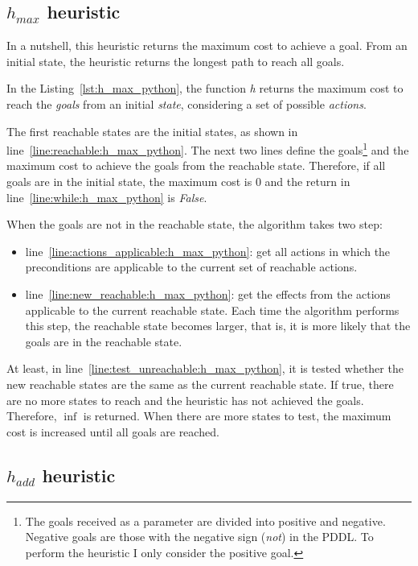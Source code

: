 \documentclass[letterpaper]{article}
\begin{document}
\subsection{$h_{max}$ heuristic}
In a nutshell, this heuristic returns the maximum cost to achieve a goal. From an initial state, the heuristic returns the longest path to reach all goals.



In the Listing~\ref{lst:h_max_python}, the function \textit{h} returns the maximum cost to reach the \textit{goals} from an initial \textit{state}, considering a set of possible \textit{actions}.

The first reachable states are the initial states, as shown in line~\ref{line:reachable:h_max_python}. The next two lines define the goals\footnote{The goals received as a parameter are divided into positive and negative. Negative goals are those with the negative sign (\textit{not}) in the PDDL. To perform the heuristic I only consider the positive goal.} and the maximum cost to achieve the goals from the reachable state. Therefore, if all goals are in the initial state, the maximum cost is $0$ and the return in line~\ref{line:while:h_max_python} is \textit{False}.

When the goals are not in the reachable state, the algorithm takes two step:

\begin{itemize}
  \item line~\ref{line:actions_applicable:h_max_python}: get all actions in which the preconditions are applicable to the current set of reachable actions.
  \item line~\ref{line:new_reachable:h_max_python}: get the effects from the actions applicable to the current reachable state. Each time the algorithm performs this step, the reachable state becomes larger, that is, it is more likely that the goals are in the reachable state.
\end{itemize}

At least, in line~\ref{line:test_unreachable:h_max_python}, it is tested whether the new reachable states are the same as the current reachable state. If true, there are no more states to reach and the heuristic has not achieved the goals. Therefore, $\inf$ is returned. When there are more states to test, the maximum cost is increased until all goals are reached.

\subsection{$h_{add}$ heuristic}
\end{document}
